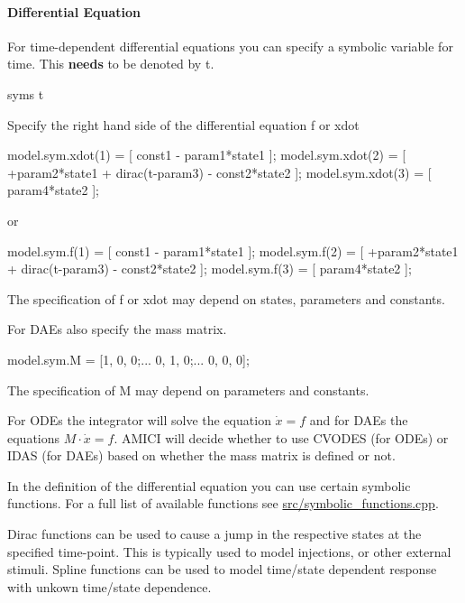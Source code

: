 \paragraph*{Differential Equation}

For time-\/dependent differential equations you can specify a symbolic variable for time. This {\bfseries{needs}} to be denoted by {\ttfamily t}. \begin{DoxyVerb}syms t
\end{DoxyVerb}


Specify the right hand side of the differential equation {\ttfamily f} or {\ttfamily xdot} \begin{DoxyVerb}model.sym.xdot(1) = [ const1 - param1*state1 ];
model.sym.xdot(2) = [ +param2*state1 + dirac(t-param3) - const2*state2 ];
model.sym.xdot(3) = [ param4*state2 ];
\end{DoxyVerb}


or \begin{DoxyVerb}model.sym.f(1) = [ const1 - param1*state1 ];
model.sym.f(2) = [ +param2*state1 + dirac(t-param3) - const2*state2 ];
model.sym.f(3) = [ param4*state2 ];
\end{DoxyVerb}


The specification of {\ttfamily f} or {\ttfamily xdot} may depend on states, parameters and constants.

For D\+A\+Es also specify the mass matrix. \begin{DoxyVerb}model.sym.M = [1, 0, 0;...
                0, 1, 0;...
                0, 0, 0];
\end{DoxyVerb}


The specification of M may depend on parameters and constants.

For O\+D\+Es the integrator will solve the equation $ \dot{x} = f $ and for D\+A\+Es the equations $ M \cdot \dot{x} = f $. A\+M\+I\+CI will decide whether to use C\+V\+O\+D\+ES (for O\+D\+Es) or I\+D\+AS (for D\+A\+Es) based on whether the mass matrix is defined or not.

In the definition of the differential equation you can use certain symbolic functions. For a full list of available functions see {\ttfamily \mbox{\hyperlink{symbolic__functions_8cpp}{src/symbolic\+\_\+functions.\+cpp}}}.

Dirac functions can be used to cause a jump in the respective states at the specified time-\/point. This is typically used to model injections, or other external stimuli. Spline functions can be used to model time/state dependent response with unkown time/state dependence.

